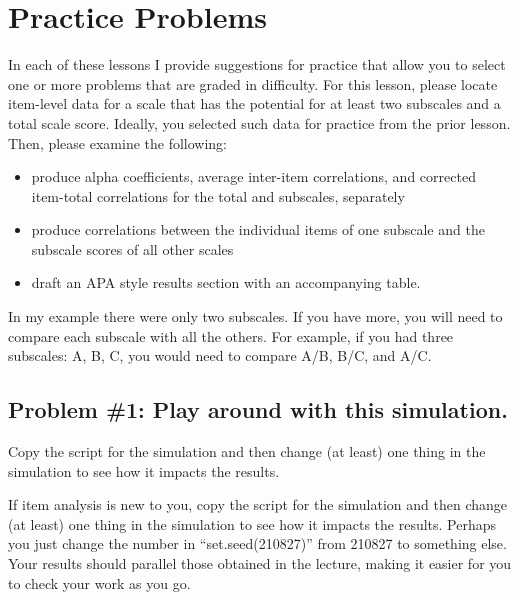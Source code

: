 \documentclass[
  english,
]{book}
\providecommand{\tightlist}{%
  \setlength{\itemsep}{0pt}\setlength{\parskip}{0pt}}
\begin{document}
\hypertarget{practice-problems-5}{%
\section{Practice Problems}\label{practice-problems-5}}

In each of these lessons I provide suggestions for practice that allow you to select one or more problems that are graded in difficulty. For this lesson, please locate item-level data for a scale that has the potential for at least two subscales and a total scale score. Ideally, you selected such data for practice from the prior lesson. Then, please examine the following:

\begin{itemize}
\tightlist
\item
  produce alpha coefficients, average inter-item correlations, and corrected item-total correlations for the total and subscales, separately
\item
  produce correlations between the individual items of one subscale and the subscale scores of all other scales
\item
  draft an APA style results section with an accompanying table.
\end{itemize}

In my example there were only two subscales. If you have more, you will need to compare each subscale with all the others. For example, if you had three subscales: A, B, C, you would need to compare A/B, B/C, and A/C.

\hypertarget{problem-1-play-around-with-this-simulation.-2}{%
\subsection{Problem \#1: Play around with this simulation.}\label{problem-1-play-around-with-this-simulation.-2}}

Copy the script for the simulation and then change (at least) one thing in the simulation to see how it impacts the results.

If item analysis is new to you, copy the script for the simulation and then change (at least) one thing in the simulation to see how it impacts the results. Perhaps you just change the number in ``set.seed(210827)'' from 210827 to something else. Your results should parallel those obtained in the lecture, making it easier for you to check your work as you go.
\end{document}

